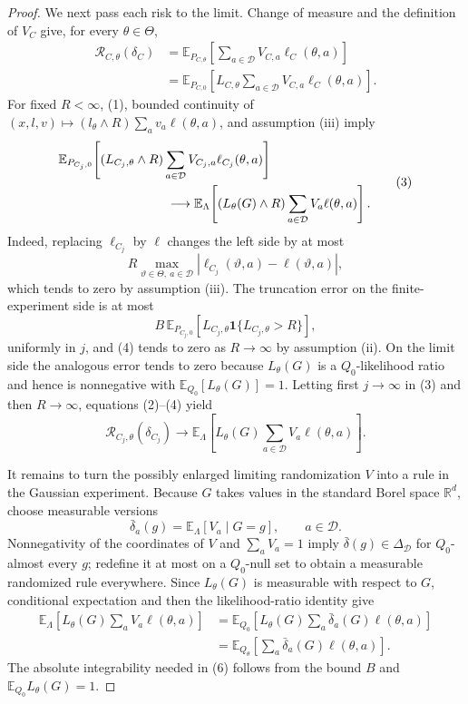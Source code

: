 \documentclass{article}
\begin{document}
\begin{proof}
We next pass each risk to the limit.  Change of measure and the definition of \(V_C\) give, for every \(\theta\in\Theta\),
\[
 \begin{aligned}
 \mathcal R_{C,\theta}(\delta_C)
 &=\mathbb E_{P_{C,\theta}}\!\left[
     \sum_{a\in\mathcal D}V_{C,a}\ell_C(\theta,a)
   \right]\\
 &=\mathbb E_{P_{C,0}}\!\left[
     L_{C,\theta}\sum_{a\in\mathcal D}V_{C,a}
     \ell_C(\theta,a)
   \right].
 \end{aligned}
 \tag{2}
\]
For fixed \(R<\infty\), (1), bounded continuity of
\((x,l,v)\mapsto(l_\theta\wedge R)\sum_a v_a\ell(\theta,a)\), and assumption (iii) imply
\[
 \begin{aligned}
 &\mathbb E_{P_{C_j,0}}\!\left[
   (L_{C_j,\theta}\wedge R)
   \sum_{a\in\mathcal D}V_{C_j,a}\ell_{C_j}(\theta,a)
 \right]\\
 &\hspace{30mm}\longrightarrow
 \mathbb E_{\Lambda}\!\left[
   (L_\theta(G)\wedge R)
   \sum_{a\in\mathcal D}V_a\ell(\theta,a)
 \right].
 \end{aligned}
 \tag{3}
\]
Indeed, replacing \(\ell_{C_j}\) by \(\ell\) changes the left side by at most
\[
 R\max_{\vartheta\in\Theta,\ a\in\mathcal D}
 |\ell_{C_j}(\vartheta,a)-\ell(\vartheta,a)|,
\]
which tends to zero by assumption (iii).  The truncation error on the finite-experiment side is at most
\[
 B\,\mathbb E_{P_{C_j,0}}\!\left[
 L_{C_j,\theta}\mathbf 1\{L_{C_j,\theta}>R\}
\right],
 \tag{4}
\]
uniformly in \(j\), and (4) tends to zero as \(R\to\infty\) by assumption (ii).  On the limit side the analogous error tends to zero because \(L_\theta(G)\) is a \(Q_0\)-likelihood ratio and hence is nonnegative with
\(\mathbb E_{Q_0}[L_\theta(G)]=1\).  Letting first \(j\to\infty\) in (3) and then \(R\to\infty\), equations (2)--(4) yield
\[
 \mathcal R_{C_j,\theta}(\delta_{C_j})
 \longrightarrow
 \mathbb E_{\Lambda}\!\left[
 L_\theta(G)\sum_{a\in\mathcal D}V_a\ell(\theta,a)
 \right].
 \tag{5}
\]

It remains to turn the possibly enlarged limiting randomization \(V\) into a rule in the Gaussian experiment.  Because \(G\) takes values in the standard Borel space \(\mathbb R^d\), choose measurable versions
\[
 \bar\delta_a(g)=\mathbb E_{\Lambda}[V_a\mid G=g],
 \qquad a\in\mathcal D.
\]
Nonnegativity of the coordinates of \(V\) and \(\sum_aV_a=1\) imply
\(\bar\delta(g)\in\Delta_{\mathcal D}\) for \(Q_0\)-almost every \(g\); redefine it at most on a \(Q_0\)-null set to obtain a measurable randomized rule everywhere.  Since \(L_\theta(G)\) is measurable with respect to \(G\), conditional expectation and then the likelihood-ratio identity give
\[
 \begin{aligned}
 \mathbb E_{\Lambda}\!\left[
 L_\theta(G)\sum_aV_a\ell(\theta,a)
 \right]
 &=\mathbb E_{Q_0}\!\left[
 L_\theta(G)\sum_a\bar\delta_a(G)\ell(\theta,a)
 \right]\\
 &=\mathbb E_{Q_\theta}\!\left[
 \sum_a\bar\delta_a(G)\ell(\theta,a)
 \right].
 \tag{6}
 \end{aligned}
\]
The absolute integrability needed in (6) follows from the bound \(B\) and
\(\mathbb E_{Q_0}L_\theta(G)=1\).


\end{proof}
\end{document}

